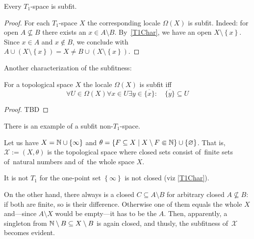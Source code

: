 \begin{thm} \label{T1->Sfit}
  Every $T_1$-space is subfit.
\end{thm}

\begin{proof}
  For each $T_1$-space $X$ the corresponding locale $\Omega(X)$ is subfit.
  Indeed: for open $A\not\subseteq B$ there exists an $x\in A \setminus B$.
  By~\ref{T1Char}\thinspace, we have an open $X\setminus \left\{x\right\}$.
  Since $x\in A$ and $x\not\in B$, we conclude with $A\cup (X\setminus
  \left\{x\right\}) = X \ne B \cup (X\setminus \left\{x\right\})$.
\end{proof}

Another characterization of the subfitness:

\begin{prop} \label{Sfit-char}
  For a topological space $X$ the locale $\Omega(X)$ is subfit iff
  \[
    \forall U\in\Omega(X) \forall x\in U \exists y\in \overline{\{x\}}: \quad
    \overline{\{y\}} \subseteq U
  \]
\end{prop}
\begin{proof}
  TBD
\end{proof}

There is an example of a subfit non-$T_1$-space.

\begin{exmpl}
  Let us have $X = \mathbb{N} \cup \left\{\infty\right\}$ and $\theta = \left\{
  F\subseteq X \mid X\setminus F \Subset \mathbb{N} \right\} \cup \left\{ \varnothing
  \right\}$.
  That is, $\mathcal{X} := (X, \theta)$ is the topological space where closed
  sets consist of~finite sets of~natural numbers and of~the whole space $X$.

  It is not $T_1$ for the one-point set $\left\{ \infty \right\}$ is not
  closed (viz \ref{T1Char}).

  On the other hand, there always is a closed $C \subseteq A\setminus B$ for
  arbitrary closed $A\not\subseteq B$:
  if both are finite, so is their difference.
  Otherwise one of them equals the whole $X$ and---since $A\setminus X$ would
  be empty---it has to be the $A$.
  Then, apparently, a singleton from $\mathbb{N}\setminus B \subseteq X\setminus B$ is
  again closed, and thusly, the subfitness of~$\mathcal{X}$ becomes evident.
\end{exmpl}
